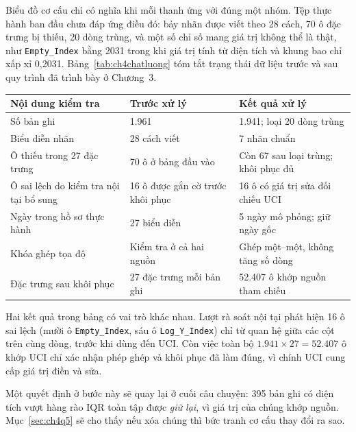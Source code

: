 \documentclass[12pt,a4paper,oneside]{report}
\newcommand{\maCot}[1]{{\urlstyle{tt}\def\UrlBreaks{\do\_\do\/\do\.}\def\UrlBigBreaks{}\nolinkurl{#1}}}
\begin{document}
Biểu đồ cơ cấu chỉ có nghĩa khi mỗi thanh ứng với đúng một nhóm. Tệp thực hành ban đầu chưa đáp ứng điều đó: bảy nhãn được viết theo 28 cách, 70 ô đặc trưng bị thiếu, 20 dòng trùng, và một số chỉ số mang giá trị không thể là thật, như \maCot{Empty_Index} bằng 2031 trong khi giá trị tính từ diện tích và khung bao chỉ xấp xỉ 0,2031. Bảng~\ref{tab:ch4chatluong} tóm tắt trạng thái dữ liệu trước và sau quy trình đã trình bày ở Chương~3.

\begin{center}\begin{minipage}{\linewidth}
\label{tab:ch4chatluong}
\small{}
\begin{tabularx}{\linewidth}{@{}Y p{3.1cm}p{3.1cm}@{}}
\toprule
Nội dung kiểm tra & Trước xử lý & Kết quả xử lý \\
\midrule
Số bản ghi & 1.961 & 1.941; loại 20 dòng trùng \\
Biểu diễn nhãn & 28 cách viết & 7 nhãn chuẩn \\
Ô thiếu trong 27 đặc trưng & 70 ô ở bảng đầu vào & Còn 67 sau loại trùng; khôi phục đủ \\
Ô sai lệch do kiểm tra nội tại bổ sung & 16 ô được gắn cờ trước khôi phục & 16 ô có giá trị sửa đối chiếu UCI \\
Ngày trong hồ sơ thực hành & 27 biểu diễn & 5 ngày mô phỏng; giữ ngày gốc \\
Khóa ghép tọa độ & Kiểm tra ở cả hai nguồn & Ghép một--một, không tăng số dòng \\
Đặc trưng sau khôi phục & 27 đặc trưng mỗi bản ghi & 52.407 ô khớp nguồn tham chiếu \\
\bottomrule
\end{tabularx}
\end{minipage}\end{center}

Hai kết quả trong bảng có vai trò khác nhau. Lượt rà soát nội tại phát hiện 16 ô sai lệch (mười ô \maCot{Empty_Index}, sáu ô \maCot{Log_Y_Index}) chỉ từ quan hệ giữa các cột trên cùng dòng, trước khi dùng đến UCI. Còn việc toàn bộ $1.941\times27=52.407$ ô khớp UCI chỉ xác nhận phép ghép và khôi phục đã làm đúng, vì chính UCI cung cấp giá trị điền và sửa.

Một quyết định ở bước này sẽ quay lại ở cuối câu chuyện: 395 bản ghi có diện tích vượt hàng rào IQR toàn tập được \emph{giữ lại}, vì giá trị của chúng khớp nguồn. Mục~\ref{sec:ch4q5} sẽ cho thấy nếu xóa chúng thì bức tranh cơ cấu thay đổi ra sao.
\end{document}
